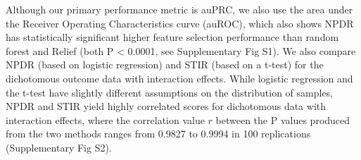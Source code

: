 \documentclass[10pt]{article}
\begin{document}

Although our primary performance metric is auPRC, we also use the area under the Receiver Operating Characteristics curve (auROC), which also shows NPDR has statistically significant higher feature selection performance than random forest and Relief (both P < 0.0001, see Supplementary Fig S1). We also compare NPDR (based on logistic regression) and STIR (based on a t-test) for the dichotomous outcome data with interaction effects.
While logistic regression and the t-test have slightly different assumptions on the distribution of samples, NPDR and STIR yield highly correlated scores for dichotomous data with interaction effects, where the correlation value $r$ between the P values produced from the two methods ranges from 0.9827 to 0.9994 in 100 replications (Supplementary Fig S2). 
\end{document}
